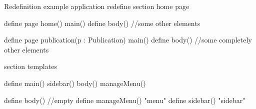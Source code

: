 \begin{webdsl}{Redefinition example}
application redefine
section home page

define page home() {
  main()
  define body() {
  	//some other elements
  }
}

define page publication(p : Publication) {
  main()
  define body() {
  	//some completely other elements
  }
}

section templates 

define main() 
{ 
  sidebar() body() manageMenu() 
}  

define body() { //empty }
define manageMenu() { "menu" }
define sidebar() {"sidebar"}
\end{webdsl}
